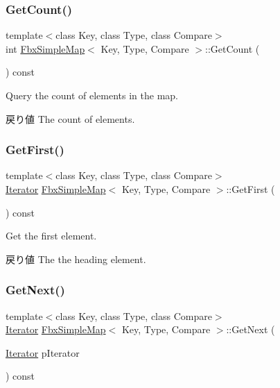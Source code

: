 \subsubsection{\texorpdfstring{Get\+Count()}{GetCount()}}
{\footnotesize\ttfamily template$<$class Key, class Type, class Compare$>$ \\
int \hyperlink{class_fbx_simple_map}{Fbx\+Simple\+Map}$<$ Key, Type, Compare $>$\+::Get\+Count (\begin{DoxyParamCaption}{ }\end{DoxyParamCaption}) const}

Query the count of elements in the map. \begin{DoxyReturn}{戻り値}
The count of elements. 
\end{DoxyReturn}
\mbox{\label{class_fbx_simple_map_a39c8ffc7721d5934c6f01211f51fd24b}} 
\subsubsection{\texorpdfstring{Get\+First()}{GetFirst()}}
{\footnotesize\ttfamily template$<$class Key, class Type, class Compare$>$ \\
\hyperlink{class_fbx_simple_map_aaa589eb5e1ccdd11dffd018f3212e13e}{Iterator} \hyperlink{class_fbx_simple_map}{Fbx\+Simple\+Map}$<$ Key, Type, Compare $>$\+::Get\+First (\begin{DoxyParamCaption}{ }\end{DoxyParamCaption}) const}

Get the first element. \begin{DoxyReturn}{戻り値}
The the heading element. 
\end{DoxyReturn}
\mbox{\label{class_fbx_simple_map_a37468d01716cbf6528a0cc26e82f7e90}} 
\subsubsection{\texorpdfstring{Get\+Next()}{GetNext()}}
{\footnotesize\ttfamily template$<$class Key, class Type, class Compare$>$ \\
\hyperlink{class_fbx_simple_map_aaa589eb5e1ccdd11dffd018f3212e13e}{Iterator} \hyperlink{class_fbx_simple_map}{Fbx\+Simple\+Map}$<$ Key, Type, Compare $>$\+::Get\+Next (\begin{DoxyParamCaption}\item[{\hyperlink{class_fbx_simple_map_aaa589eb5e1ccdd11dffd018f3212e13e}{Iterator}}]{p\+Iterator }\end{DoxyParamCaption}) const}

